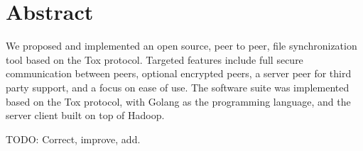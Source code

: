 \section*{Abstract}

We proposed and implemented an open source, peer to peer, file synchronization tool based on the Tox protocol.
Targeted features include full secure communication between peers, optional encrypted peers, a server peer for third party support, and a focus on ease of use.
The software suite was implemented based on the Tox protocol, with Golang as the programming language, and the server client built on top of Hadoop.

TODO: Correct, improve, add.

